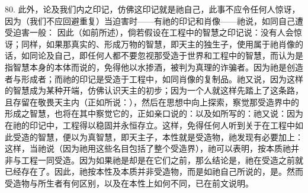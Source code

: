 80. 此外，论及我们内之印记，仿佛这印记就是祂自己，此事不应令任何人惊讶，因为（我们不应回避重复）当迫害时——有祂的印记和肖像——祂说，如同自己遭受迫害一般： 因此（如前所述），倘若假设在工程中的智慧之印记说：没有人会惊讶；同样，如果那真实的、形成万物的智慧，即天主的独生子，使用属于祂肖像的话，如同论及自己，即任何人都不要忽视那受造于世界和工程中的智慧，而认为是指智慧本身的本体而说的，免得他以水掺酒，被判为真理的诈骗者。因为祂是创造者与形成者；而祂的印记是受造于工程中，如同肖像的复制品。祂又说，因为这样的智慧成为某种开端，仿佛认识天主的初步；因为一个人就这样先踏上了这条路，且存留在敬畏天主内（正如所说：），然后在思想中向上探索，察觉那受造界中的形成之智慧，也将在其中察觉它的，正如亲口说的：以及如所写的：祂又说：因为在祂的印记中，工程得以稳固并永恒存立。这样，免得任何人听到关于在工程中如此受造的智慧，便以为真智慧，即天主子，本性就是受造物，祂发现有必要加上：这样，当祂说（因为祂用这些名目包括了整个受造界），祂可以表明，按本质祂并非与工程一同受造。因为如果祂是却是在它们之前，那么结论是，祂在受造之前就已经存在了。因此，祂按本性及本质并非受造物，而是如祂自己所说的，是。然而受造物与所生者有何区别，以及在本性上如何不同，已在前文说明。\par

